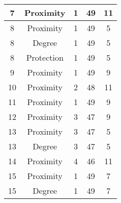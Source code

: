 \documentclass[results.tex]{subfiles}
\begin{document}
\begin{center}
\begin{tabular}{| c || c | c | c | c |}
            \hline
            7                       & Proximity                    & 1                      & 49                      & 11                   \\
            \hline
            8                       & Proximity                    & 1                      & 49                      & 5                    \\
            \hline
            8                       & Degree                       & 1                      & 49                      & 5                    \\
            \hline
            8                       & Protection                   & 1                      & 49                      & 5                    \\
            \hline
            9                       & Proximity                    & 1                      & 49                      & 9                    \\
            \hline
            10                      & Proximity                    & 2                      & 48                      & 11                   \\
            \hline
            11                      & Proximity                    & 1                      & 49                      & 9                    \\
            \hline
            12                      & Proximity                    & 3                      & 47                      & 9                    \\
            \hline
            13                      & Proximity                    & 3                      & 47                      & 5                    \\
            \hline
            13                      & Degree                       & 3                      & 47                      & 5                    \\
            \hline
            14                      & Proximity                    & 4                      & 46                      & 11                   \\
            \hline
            15                      & Proximity                    & 1                      & 49                      & 7                    \\
            \hline
            15                      & Degree                       & 1                      & 49                      & 7                    \\

\end{tabular}
\end{center}
\end{document}
